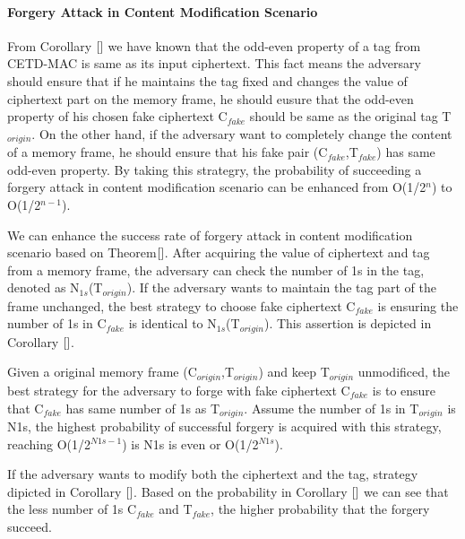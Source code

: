 \paragraph{Forgery Attack in Content Modification Scenario}
From Corollary $\ref{}$ we have known that the odd-even property of a tag from CETD-MAC is same as its input ciphertext. 
This fact means the adversary should ensure that if he maintains the tag fixed and changes the value of ciphertext part on the memory frame, he should eusure that the odd-even property of his chosen fake ciphertext C$_{fake}$ should be same as the original tag T$_{origin}$. On the other hand, if the adversary want to completely change the content of a memory frame, he should ensure that his fake pair (C$_{fake}$,T$_{fake}$) has same odd-even property. By taking this strategry, the probability of succeeding a forgery attack in content modification scenario can be enhanced from O(1/2$^n$) to O(1/2$^{n-1}$).

We can enhance the success rate of forgery attack in content modification scenario based on Theorem$\ref{}$. After acquiring the value of ciphertext and tag from a memory frame, the adversary can check the number of 1s in the tag, denoted as N$_{1s}$(T$_{origin}$). If the adversary wants to maintain the tag part of the frame unchanged, the best strategy to choose fake ciphertext C$_{fake}$ is ensuring the number of 1s in C$_{fake}$ is identical to N$_{1s}$(T$_{origin}$). This assertion is depicted in Corollary $\ref{}$. 
\begin{corollary}
Given a original memory frame (C$_{origin}$,T$_{origin}$) and keep T$_{origin}$ unmodificed, the best strategy for the adversary to forge with fake ciphertext C$_{fake}$ is to ensure that C$_{fake}$ has same number of 1s as T$_{origin}$. Assume the number of 1s in T$_{origin}$ is N1s, the highest probability of successful forgery is acquired with this strategy, reaching O(1/2$^{N1s-1}$) is N1s is even or O(1/2$^{N1s}$).   
\end{corollary}
If the adversary wants to modify both the ciphertext and the tag, strategy dipicted in Corollary $\ref{}$. Based on the probability in Corollary $\ref{}$ we can see that the less number of 1s C$_{fake}$ and T$_{fake}$, the higher probability that the forgery succeed.  

